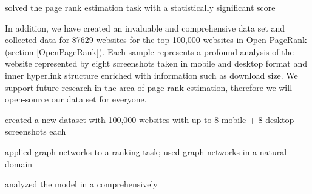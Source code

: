 solved the page rank estimation task with a statistically significant score

In addition, we have created an invaluable and comprehensive data set and collected data for 87629 websites for the top 100,000 websites in Open PageRank (section \ref{OpenPageRank}). Each sample represents a profound analysis of the website represented by eight screenshots taken in mobile and desktop format and inner hyperlink structure enriched with information such as download size. We support future research in the area of page rank estimation, therefore we will open-source our data set for everyone.

created a new dataset with 100,000 websites with up to 8 mobile + 8 desktop screenshots each

applied graph networks to a ranking task; used graph networks in a natural domain

analyzed the model in a comprehensively
